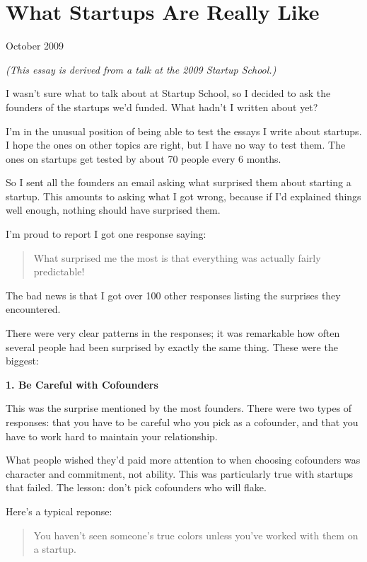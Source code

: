\chapter{What Startups Are Really Like}

October 2009

\emph{(This essay is derived from a talk at the 2009 Startup School.)}

I wasn't sure what to talk about at Startup School, so I decided to ask
the founders of the startups we'd funded. What hadn't I written about
yet?

I'm in the unusual position of being able to test the essays I write
about startups. I hope the ones on other topics are right, but I have no
way to test them. The ones on startups get tested by about 70 people
every 6 months.

So I sent all the founders an email asking what surprised them about
starting a startup. This amounts to asking what I got wrong, because if
I'd explained things well enough, nothing should have surprised them.

I'm proud to report I got one response saying:

\begin{quote}
What surprised me the most is that everything was actually fairly
predictable!
\end{quote}

The bad news is that I got over 100 other responses listing the
surprises they encountered.

There were very clear patterns in the responses; it was remarkable how
often several people had been surprised by exactly the same thing. These
were the biggest:

\textbf{1. Be Careful with Cofounders}

This was the surprise mentioned by the most founders. There were two
types of responses: that you have to be careful who you pick as a
cofounder, and that you have to work hard to maintain your relationship.

What people wished they'd paid more attention to when choosing
cofounders was character and commitment, not ability. This was
particularly true with startups that failed. The lesson: don't pick
cofounders who will flake.

Here's a typical reponse:

\begin{quote}
You haven't seen someone's true colors unless you've worked with them on
a startup.
\end{quote}

